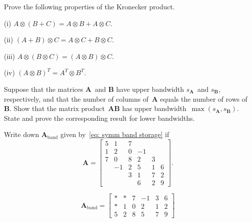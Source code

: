 \begin{Exercises}
\exercise
Prove the following properties of the Kronecker product.
\begin{description}
\item{(i)} $A\otimes(B+C)=A\otimes B+A\otimes C$.
\item{(ii)} $(A+B)\otimes C=A\otimes C+B\otimes C$.
\item{(iii)} $A\otimes(B\otimes C)=(A\otimes B)\otimes C$.
\item{(iv)} $(A\otimes B)^T=A^T\otimes B^T$.
\end{description}

\exercise
Suppose that the matrices $\boldsymbol{A}$~and $\boldsymbol{B}$ have upper 
bandwidth $s_{\boldsymbol{A}}$~and $s_{\boldsymbol{B}}$, respectively, and that 
the number of columns of~$\boldsymbol{A}$ equals the number of rows 
of~$\boldsymbol{B}$.  Show that the matrix 
product~$\boldsymbol{A}\boldsymbol{B}$ has upper 
bandwidth~$\max(s_{\boldsymbol{A}},s_{\boldsymbol{B}})$.  State and prove the 
corresponding result for lower bandwidths.

\exercise
Write down $\boldsymbol{A}_{\mathrm{band}}$ given 
by~\eqref{eq: symm band storage} if
\[
\boldsymbol{A}=\begin{bmatrix}
 5& 1& 7&  &  &\\
 1& 2& 0&-1&  &\\
 7& 0& 8& 2& 3&\\
  &-1& 2& 5& 1& 6\\
  &  & 3& 1& 7& 2\\
  &  &  & 6& 2& 9
\end{bmatrix}.
\]
\begin{ans}
\[
\boldsymbol{A}_{\mathrm{band}}=\begin{bmatrix}
 *& *& 7&-1& 3& 6\\
 *& 1& 0& 2& 1& 2\\
 5& 2& 8& 5& 7& 9                                
\end{bmatrix}
\]
\end{ans}


\end{Exercises}
